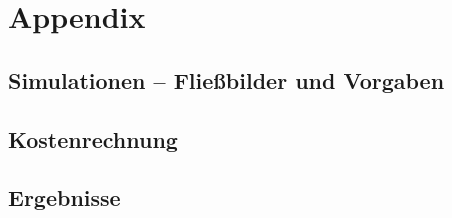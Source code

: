 \section*{Appendix}

\subsection{Simulationen -- Fließbilder und Vorgaben}
\label{ch:a_sim}



\subsection{Kostenrechnung}
\label{ch:a_kosten}


\subsection{Ergebnisse}
\label{ch:a_erg}